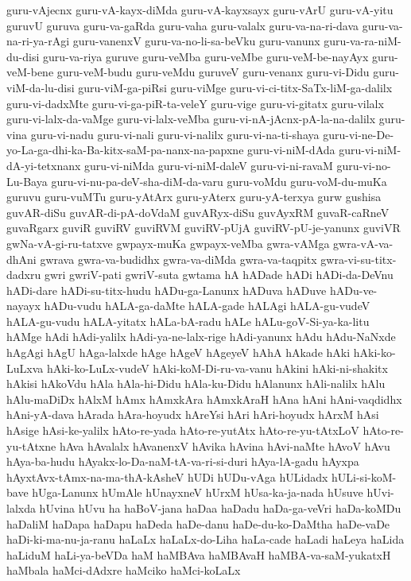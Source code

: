 {guru-vAjecnx
guru-vA-kayx-diMda
guru-vA-kayxsayx
guru-vArU
guru-vA-yitu
guruvU
guruva
guru-va-gaRda
guru-vaha
guru-valalx
guru-va-na-ri-dava
guru-va-na-ri-ya-rAgi
guru-vanenxV
guru-va-no-li-sa-beVku
guru-vanunx
guru-va-ra-niM-du-disi
guru-va-riya
guruve
guru-veMba
guru-veMbe
guru-veM-be-nayAyx
guru-veM-bene
guru-veM-budu
guru-veMdu
guruveV
guru-venanx
guru-vi-Didu
guru-viM-da-lu-disi
guru-viM-ga-piRsi
guru-viMge
guru-vi-ci-titx-SaTx-liM-ga-dalilx
guru-vi-dadxMte
guru-vi-ga-piR-ta-veleY
guru-vige
guru-vi-gitatx
guru-vilalx
guru-vi-lalx-da-vaMge
guru-vi-lalx-veMba
guru-vi-nA-jAcnx-pA-la-na-dalilx
guru-vina
guru-vi-nadu
guru-vi-nali
guru-vi-nalilx
guru-vi-na-ti-shaya
guru-vi-ne-De-yo-La-ga-dhi-ka-Ba-kitx-saM-pa-nanx-na-papxne
guru-vi-niM-dAda
guru-vi-niM-dA-yi-tetxnanx
guru-vi-niMda
guru-vi-niM-daleV
guru-vi-ni-ravaM
guru-vi-no-Lu-Baya
guru-vi-nu-pa-deV-sha-diM-da-varu
guru-voMdu
guru-voM-du-muKa
guruvu
guru-vuMTu
guru-yAtArx
guru-yAterx
guru-yA-terxya
gurw
gushisa
guvAR-diSu
guvAR-di-pA-doVdaM
guvARyx-diSu
guvAyxRM
guvaR-caRneV
guvaRgarx
guviR
guviRV
guviRVM
guviRV-pUjA
guviRV-pU-je-yanunx
guviVR
gwNa-vA-gi-ru-tatxve
gwpayx-muKa
gwpayx-veMba
gwra-vAMga
gwra-vA-va-dhAni
gwrava
gwra-va-budidhx
gwra-va-diMda
gwra-va-taqpitx
gwra-vi-su-titx-dadxru
gwri
gwriV-pati
gwriV-suta
gwtama
hA
hADade
hADi
hADi-da-DeVnu
hADi-dare
hADi-su-titx-hudu
hADu-ga-Lanunx
hADuva
hADuve
hADu-ve-nayayx
hADu-vudu
hALA-ga-daMte
hALA-gade
hALAgi
hALA-gu-vudeV
hALA-gu-vudu
hALA-yitatx
hALa-bA-radu
hALe
hALu-goV-Si-ya-ka-litu
hAMge
hAdi
hAdi-yalilx
hAdi-ya-ne-lalx-rige
hAdi-yanunx
hAdu
hAdu-NaNxde
hAgAgi
hAgU
hAga-lalxde
hAge
hAgeV
hAgeyeV
hAhA
hAkade
hAki
hAki-ko-LuLxva
hAki-ko-LuLx-vudeV
hAki-koM-Di-ru-va-vanu
hAkini
hAki-ni-shakitx
hAkisi
hAkoVdu
hAla
hAla-hi-Didu
hAla-ku-Didu
hAlanunx
hAli-nalilx
hAlu
hAlu-maDiDx
hAlxM
hAmx
hAmxkAra
hAmxkAraH
hAna
hAni
hAni-vaqdidhx
hAni-yA-dava
hArada
hAra-hoyudx
hAreYsi
hAri
hAri-hoyudx
hArxM
hAsi
hAsige
hAsi-ke-yalilx
hAto-re-yada
hAto-re-yutAtx
hAto-re-yu-tAtxLoV
hAto-re-yu-tAtxne
hAva
hAvalalx
hAvanenxV
hAvika
hAvina
hAvi-naMte
hAvoV
hAvu
hAya-ba-hudu
hAyakx-lo-Da-naM-tA-va-ri-si-duri
hAya-lA-gadu
hAyxpa
hAyxtAvx-tAmx-na-ma-thA-kAsheV
hUDi
hUDu-vAga
hULidadx
hULi-si-koM-bave
hUga-Lanunx
hUmAle
hUnayxneV
hUrxM
hUsa-ka-ja-nada
hUsuve
hUvi-lalxda
hUvina
hUvu
ha
haBoV-jana
haDaa
haDadu
haDa-ga-veVri
haDa-koMDu
haDaliM
haDapa
haDapu
haDeda
haDe-danu
haDe-du-ko-DaMtha
haDe-vaDe
haDi-ki-ma-nu-ja-ranu
haLaLx
haLaLx-do-Liha
haLa-cade
haLadi
haLeya
haLida
haLiduM
haLi-ya-beVDa
haM
haMBAva
haMBAvaH
haMBA-va-saM-yukatxH
haMbala
haMci-dAdxre
haMciko
haMci-koLaLx
}
